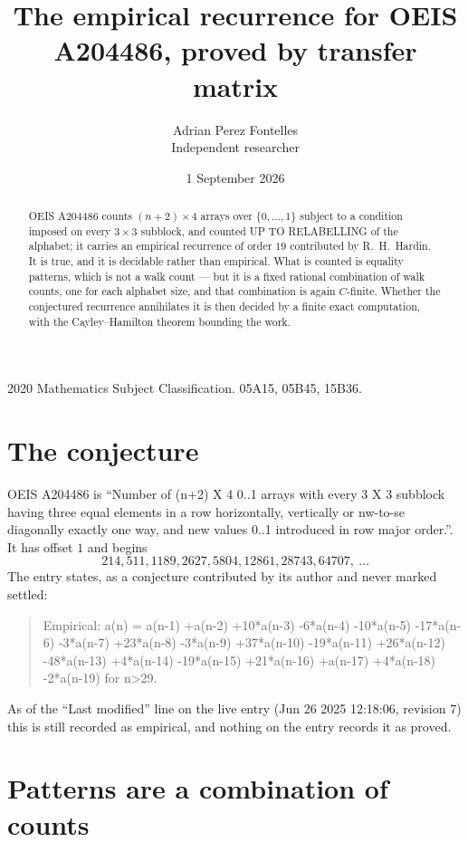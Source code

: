 \documentclass[11pt,a4paper]{article}
\title{The empirical recurrence for OEIS A204486, proved by transfer matrix}
\author{Adrian Perez Fontelles\\ \small Independent researcher}
\date{1 September 2026}
\theoremstyle{plain}
\theoremstyle{definition}
\begin{document}
\maketitle

\begin{abstract}
OEIS A204486 counts $(n+2)\times4$ arrays over $\{0,\dots,1\}$ subject to a condition imposed on
every $3\times3$ subblock, and counted UP TO RELABELLING of the
alphabet; it carries an empirical recurrence of order $19$ contributed by
R.~H.~Hardin. It is true, and it is decidable rather than empirical. What is counted is
equality patterns, which is not a walk count --- but it is a fixed rational combination of
walk counts, one for each alphabet size, and that combination is again $C$-finite. Whether the
conjectured recurrence annihilates it is then decided by a finite exact computation, with the
Cayley--Hamilton theorem bounding the work.
\end{abstract}

\noindent\small 2020 Mathematics Subject Classification. 05A15, 05B45, 15B36.\normalsize

\section{The conjecture}

OEIS A204486 is ``Number of (n+2) X 4 0..1 arrays with every 3 X 3 subblock having three equal elements in a row horizontally, vertically or nw-to-se diagonally exactly one way, and new values 0..1 introduced in row major order.''. It has offset $1$ and begins
\[
214, 511, 1189, 2627, 5804, 12861, 28743, 64707,\ \dots
\]
The entry states, as a conjecture contributed by its author and never marked settled:
\begin{quote}
Empirical: a(n) = a(n-1) +a(n-2) +10*a(n-3) -6*a(n-4) -10*a(n-5) -17*a(n-6) -3*a(n-7) +23*a(n-8) -3*a(n-9) +37*a(n-10) -19*a(n-11) +26*a(n-12) -48*a(n-13) +4*a(n-14) -19*a(n-15) +21*a(n-16) +a(n-17) +4*a(n-18) -2*a(n-19) for n>29.
\end{quote}
As of the ``Last modified'' line on the live entry (Jun 26 2025 12:18:06, revision 7) this is still
recorded as empirical, and nothing on the entry records it as proved.

\section{Patterns are a combination of counts}
\end{document}
